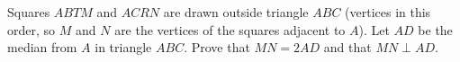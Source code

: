 Squares $ABTM$ and $ACRN$ are drawn outside triangle $ABC$ (vertices in this order, so $M$ and $N$ are the vertices of the squares adjacent to $A$). Let $AD$ be the median from $A$ in triangle $ABC$. Prove that $MN=2AD$ and that $MN\perp AD$.
